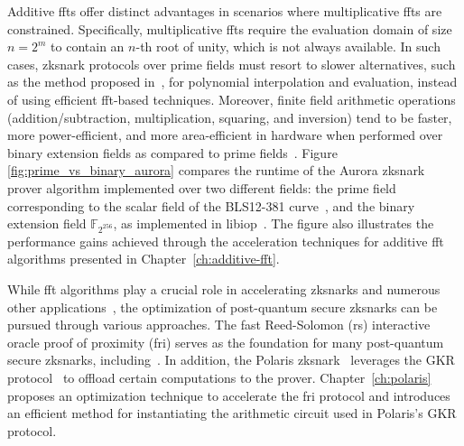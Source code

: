 Additive \glspl{fft} offer distinct advantages in scenarios where multiplicative \glspl{fft} are constrained. Specifically, multiplicative \glspl{fft} require the evaluation domain of size  $n=2^m$ to contain an $n$-th root of unity, which is not always available. In such cases, \gls{zksnark} protocols over prime fields must resort to slower alternatives, such as the method proposed in~\cite{BOSTAN2005Evaluation}, for polynomial interpolation and evaluation, instead of using efficient \gls{fft}-based techniques. Moreover, finite field arithmetic operations (addition/subtraction, multiplication, squaring, and inversion) tend to be faster, more power-efficient, and more area-efficient in hardware when performed over binary extension fields as compared to prime fields~\cite{Wenger2012PrimevsBinary, Diamond2023Towers}.
Figure \ref{fig:prime_vs_binary_aurora} compares the runtime of the Aurora \gls{zksnark}~\cite{Aurora2019} prover algorithm implemented over two different fields: the prime field corresponding to the scalar field of the BLS12-381 curve~\cite{BLS_curve2003}, and the binary extension field $\mathbb{F}_{2^{256}}$, as implemented in libiop~\cite{libiop}. The figure also illustrates the performance gains achieved through the acceleration techniques for additive \gls{fft} algorithms presented in Chapter~\ref{ch:additive-fft}.


While \gls{fft} algorithms play a crucial role in accelerating \glspl{zksnark} and numerous other applications~\cite{Bisheh2021NTT,LCH-Fast_Mult2018,LCH-Frobenius2018,BernsteinChouSchwabe2013,BernsteinChou2014}, the optimization of post-quantum secure \glspl{zksnark} can be pursued through various approaches. The fast Reed-Solomon (\gls{rs}) interactive oracle proof of proximity (\gls{fri}) serves as the foundation for many post-quantum secure \glspl{zksnark}, including~\cite{Ben-Sasson2018STARK,Aurora2019,Chiesa2020Fractal,Polaris}. In addition, the Polaris \gls{zksnark}~\cite{Polaris} leverages the GKR protocol~\cite{GKR2008} to offload certain computations to the prover. Chapter~\ref{ch:polaris} proposes an optimization technique to accelerate the \gls{fri} protocol and introduces an efficient method for instantiating the arithmetic circuit used in Polaris's GKR protocol.


